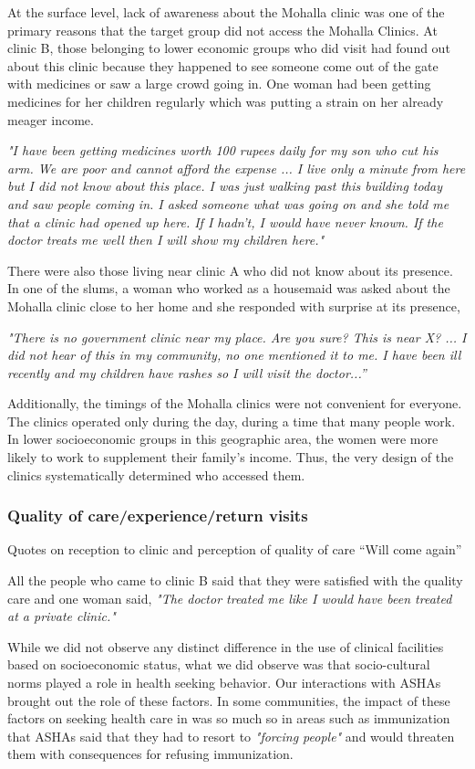 At the surface level, lack of awareness about the Mohalla clinic was one of the primary reasons that the target group did not access the Mohalla Clinics. At clinic B, those belonging to lower economic groups who did visit had found out about this clinic because they happened to see someone come out of the gate with medicines or saw a large crowd going in. One woman had been getting medicines for her children regularly which was putting a strain on her already meager income. 

\textit{"I have been getting medicines worth 100 rupees daily for my son who cut his arm. We are poor and cannot afford the expense ... I live only a minute from here but I did not know about this place. I was just walking past this building today and saw people coming in. I asked someone what was going on and she told me that a clinic had opened up here. If I hadn't, I would have never known. If the doctor treats me well then I will show my children here."}

There were also those living near clinic A who did not know about its presence. In one of the slums, a woman who worked as a housemaid was asked about the Mohalla clinic close to her home and she responded with surprise at its presence,

\textit{"There is no government clinic near my place. Are you sure? This is near X? ... I did not hear of this in my community, no one mentioned it to me. I have been ill recently and my children have rashes so I will visit the doctor...”}

Additionally, the timings of the Mohalla clinics were not convenient for everyone. The clinics operated only during the day, during a time that many people work. In lower socioeconomic groups in this geographic area, the women were more likely to work to supplement their family's income. Thus, the very design of the clinics systematically determined who accessed them.

\subsubsection{Quality of care/experience/return visits}
Quotes on reception to clinic and perception of quality of care
“Will come again”

All the people who came to clinic B said that they were satisfied with the quality care and one woman said,
\textit{"The doctor treated me like I would have been treated at a private clinic."}

While we did not observe any distinct difference in the use of clinical facilities based on socioeconomic status, what we did observe was that socio-cultural norms played a role in health seeking behavior. Our interactions with ASHAs brought out the role of these factors. In some communities, the impact of these factors on seeking health care in was so much so in areas such as immunization that ASHAs said that they had to resort to \textit{"forcing people"} and would threaten them with consequences for refusing immunization.

